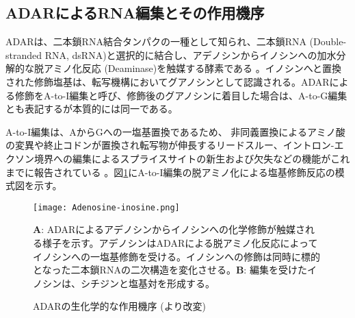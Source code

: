 \subsection{ADARによるRNA編集とその作用機序}
ADARは、二本鎖RNA結合タンパクの一種として知られ、二本鎖RNA (Double-stranded RNA, dsRNA)と選択的に結合し、アデノシンからイノシンへの加水分解的な脱アミノ化反応 (Deaminase)を触媒する酵素である \citep{Bas02, KeeLerSpr04, ValNis05}。イノシンへと置換された修飾塩基は、転写機構においてグアノシンとして認識される。ADARによる修飾をA-to-I編集と呼び、修飾後のグアノシンに着目した場合は、A-to-G編集とも表記するが本質的には同一である。
\par
A-to-I編集は、AからGへの一塩基置換であるため、
非同義置換によるアミノ酸の変異や終止コドンが置換され転写物が伸長するリードスルー、イントロン-エクソン境界への編集によるスプライスサイトの新生および欠失などの機能がこれまでに報告されている \citep{MenCheJin10, FloKniSha04, FukIto1012}。図\ref{fig:Chemical_reaction}にA-to-I編集の脱アミノ化による塩基修飾反応の模式図を示す。

\begin{figure}[!h]
	\begin{center}
		\texttt{[image: Adenosine-inosine.png]}
	\end{center}
	\caption{ADARの生化学的な作用機序 (\cite{Nis10}より改変)}
	\begin{flushleft}
		\small{\textbf{A}: ADARによるアデノシンからイノシンへの化学修飾が触媒される様子を示す。アデノシンはADARによる脱アミノ化反応によってイノシンへの一塩基修飾を受ける。イノシンへの修飾は同時に標的となった二本鎖RNAの二次構造を変化させる。\textbf{B}: 編集を受けたイノシンは、シチジンと塩基対を形成する。}
	\end{flushleft}
	\label{fig:Chemical_reaction}
\end{figure}

